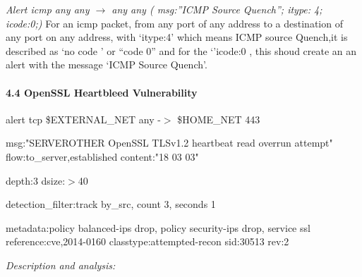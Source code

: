 \documentclass{article} %
\begin{document}
\noindent \textit{Alert icmp any any $\to$ any any ( msg:''ICMP Source Quench''; itype: 4; icode:0;) }For an icmp packet, from any port of any address to a destination of any port on any address, with `itype:4'  which means ICMP source Quench,it is described as `no code ' or  ``code 0'' and for the `'icode:0 , this shoud create an an alert with the message `ICMP Source Quench'.

\noindent 

\noindent 
\paragraph{4.4 OpenSSL Heartbleed Vulnerability }

\noindent alert tcp \$EXTERNAL\_NET any -$>$ \$HOME\_NET 443 

\noindent msg:"SERVEROTHER OpenSSL TLSv1.2 heartbeat read overrun attempt" flow:to\_server,established content:"{\textbar}18 03 03{\textbar}"

\noindent depth:3 dsize:$>$40

\noindent detection\_filter:track by\_src, count 3, seconds 1

\noindent metadata:policy balanced-ips drop, policy security-ips drop, service ssl reference:cve,2014-0160 classtype:attempted-recon sid:30513 rev:2

\noindent \textit{Description and analysis:}
\end{document}
